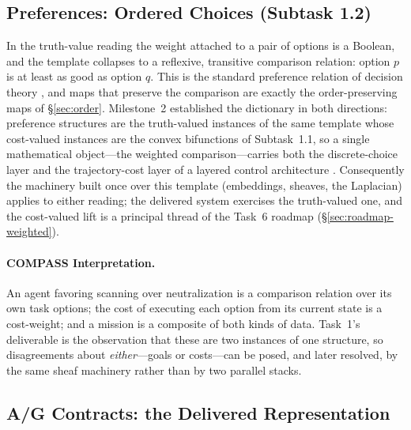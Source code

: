 \documentclass[11pt]{article}
\newif\ifshowcomments
\theoremstyle{definition}
\theoremstyle{remark}
\newcommand{\prompt}[1]{%
    \ifshowcomments
        ~\todo[inline, color=techgold!80, textcolor=black,caption={Task}]{{\bf Prompt:} #1}%
    \fi
}
\begin{document}
\subsection{Preferences: Ordered Choices (Subtask 1.2)}
\label{sec:subtask12}

\prompt{Preferences (e.g., an agent favoring scanning over neutralization) are modeled as a
$\mathbb{B}$-enriched category, with morphisms representing transitive preference relations.
Deliverable: Preference modeling framework, included in Milestone 2's report.}

In the truth-value reading the weight attached to a pair of options is a Boolean, and the
template collapses to a reflexive, transitive comparison relation: option $p$ is at least as
good as option $q$.
This is the standard preference relation of decision theory \citep{arrowSocialChoice2012},
and maps that preserve the comparison are exactly the order-preserving maps of
\S\ref{sec:order}.
Milestone~2 established the dictionary in both directions: preference structures are the
truth-valued instances of the same template whose cost-valued instances are the convex
bifunctions of Subtask~1.1, so a single mathematical object---the weighted comparison---carries
both the discrete-choice layer and the trajectory-cost layer of a layered control architecture
\citep{matniQuantitativeFrameworkLayered2024}.
Consequently the machinery built once over this template (embeddings, sheaves, the Laplacian)
applies to either reading; the delivered system exercises the truth-valued one, and the
cost-valued lift is a principal thread of the Task~6 roadmap (\S\ref{sec:roadmap-weighted}).

\paragraph{COMPASS Interpretation.}
An agent favoring scanning over neutralization is a comparison relation over its own task
options; the cost of executing each option from its current state is a cost-weight; and a
mission is a composite of both kinds of data.
Task~1's deliverable is the observation that these are two instances of one structure, so
disagreements about \emph{either}---goals or costs---can be posed, and later resolved, by the
same sheaf machinery rather than by two parallel stacks.

\subsection{A/G Contracts: the Delivered Representation}
\label{sec:contracts}
\end{document}
